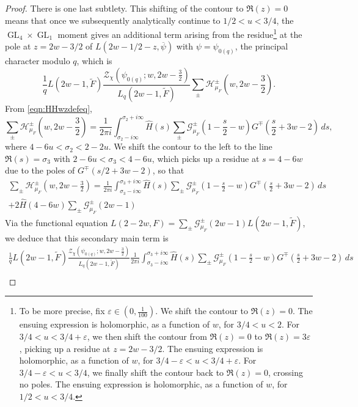 \documentclass[11pt,a4paper]{amsart}
\newcommand{\e}{\varepsilon}
\newcommand{\Gscr}{\mathscr{G}}
\newcommand{\HH}{\mathcal{H}}
\newcommand{\ZZ}{\mathcal{Z}}
\DeclareMathOperator{\GL}{GL}
\numberwithin{equation}{section}
\theoremstyle{remark}
\theoremstyle{definition}
\begin{document}
\begin{proof}
There is one last subtlety. This shifting of the contour to $\Re(z) = 0$ means that once we subsequently analytically continue to $1/2 < u < 3/4$, the $\GL_4 \times \GL_1$ moment gives an additional term arising from the residue\footnote{To be more precise, fix $\e \in (0,\frac{1}{100})$. We shift the contour to $\Re(z) = 0$. The ensuing expression is holomorphic, as a function of $w$, for $3/4 < u < 2$. For $3/4 < u < 3/4 + \e$, we then shift the contour from $\Re(z) = 0$ to $\Re(z) = 3\e$, picking up a residue at $z = 2w - 3/2$. The ensuing expression is holomorphic, as a function of $w$, for $3/4 - \e < u < 3/4 + \e$. For $3/4 - \e < u < 3/4$, we finally shift the contour back to $\Re(z) = 0$, crossing no poles. The ensuing expression is holomorphic, as a function of $w$, for $1/2 < u < 3/4$.} at the pole at $z = 2w - 3/2$ of $L(2w - 1/2 - z,\overline{\psi})$ with $\psi = \psi_{0(q)}$, the principal character modulo $q$, which is
\[\frac{1}{q} L(2w - 1, \widetilde{F}) \frac{\ZZ_{\chi}\left(\psi_{0(q)};w,2w - \frac{3}{2}\right)}{L_q(2w - 1, \widetilde{F})} \sum_{\pm} \HH_{\mu_F}^{\pm}\left(w,2w - \frac{3}{2}\right).\]
From \eqref{eqn:HHwzdefeq},
\[\sum_{\pm} \HH_{\mu_F}^{\pm}\left(w,2w - \frac{3}{2}\right) = \frac{1}{2\pi i} \int_{\sigma_2 - i\infty}^{\sigma_2 + i\infty} \widehat{H}(s) \sum_{\pm} \Gscr_{\mu_F}^{\pm}\left(1 - \frac{s}{2} - w\right) G^{\mp}\left(\frac{s}{2} + 3w - 2\right) \, ds,\]
where $4 - 6u < \sigma_2 < 2 - 2u$. We shift the contour to the left to the line $\Re(s) = \sigma_3$ with $2 - 6u < \sigma_3 < 4 - 6u$, which picks up a residue at $s = 4 - 6w$ due to the poles of $G^{\mp}(s/2 + 3w - 2)$, so that
\begin{multline*}
\sum_{\pm} \HH_{\mu_F}^{\pm}\left(w,2w - \frac{3}{2}\right) = \frac{1}{2\pi i} \int_{\sigma_3 - i\infty}^{\sigma_3 + i\infty} \widehat{H}(s) \sum_{\pm} \Gscr_{\mu_F}^{\pm}\left(1 - \frac{s}{2} - w\right) G^{\mp}\left(\frac{s}{2} + 3w - 2\right) \, ds	\\
+ 2 \widehat{H}(4 - 6w) \sum_{\pm} \Gscr_{\mu_F}^{\pm}(2w - 1)
\end{multline*}
Via the functional equation $L(2 - 2w,F) = \sum_{\pm} \Gscr_{\mu_F}^{\pm}(2w - 1) L(2w - 1,\widetilde{F})$, we deduce that this secondary main term is
\begin{multline*}
\frac{1}{q} L(2w - 1, \widetilde{F}) \frac{\ZZ_{\chi}\left(\psi_{0(q)};w,2w - \frac{3}{2}\right)}{L_q(2w - 1, \widetilde{F})} \frac{1}{2\pi i} \int_{\sigma_3 - i\infty}^{\sigma_3 + i\infty} \widehat{H}(s) \sum_{\pm} \Gscr_{\mu_F}^{\pm}\left(1 - \frac{s}{2} - w\right) G^{\mp}\left(\frac{s}{2} + 3w - 2\right) \, ds	\\

\end{multline*}
\end{proof}
\end{document}
